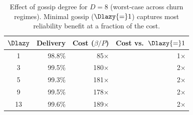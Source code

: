 \begin{table}[t]
      \centering
      \small
      \renewcommand{\arraystretch}{0.85}
      \caption{Effect of gossip degree for $D{=}8$ (worst-case across churn regimes).
            Minimal gossip ($\Dlazy{=}1$) captures most reliability benefit at
            a fraction of the cost.}
      \label{tab:minimal-gossip}
      \begin{tabular}{crrr}
            \toprule
            $\Dlazy$ & Delivery & Cost ($\beta/P$) & Cost vs.\ $\Dlazy{=}1$ \\
            \midrule
            1        & 98.8\%   & 85$\times$       & 1$\times$              \\
            3        & 99.5\%   & 180$\times$      & 2$\times$              \\
            5        & 99.3\%   & 181$\times$      & 2$\times$              \\
            9        & 99.5\%   & 178$\times$      & 2$\times$              \\
            13       & 99.6\%   & 189$\times$      & 2$\times$              \\
            \bottomrule
      \end{tabular}
\end{table}
